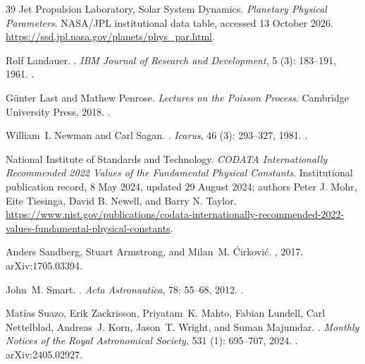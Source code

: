 \begin{thebibliography}{39}
Jet Propulsion Laboratory, Solar System Dynamics.
\newblock \emph{Planetary Physical Parameters}.
\newblock NASA/JPL institutional data table, accessed 13 October 2026.
\newblock \url{https://ssd.jpl.nasa.gov/planets/phys_par.html}.

Rolf Landauer.
.
\newblock \emph{IBM Journal of Research and Development}, 5
  (3): 183--191, 1961.
\newblock {}.

G{\"u}nter Last and Mathew Penrose.
\newblock \emph{{Lectures on the {Poisson} Process}}.
\newblock Cambridge University Press, 2018.
\newblock {}.

William~I. Newman and Carl Sagan.
.
\newblock \emph{Icarus}, 46 (3): 293--327, 1981.
\newblock {}.

National Institute of Standards and Technology.
\newblock \emph{CODATA Internationally Recommended 2022 Values of the
Fundamental Physical Constants}.
\newblock Institutional publication record, 8 May 2024, updated 29 August
2024; authors Peter J. Mohr, Eite Tiesinga, David B. Newell, and Barry N. Taylor.
\newblock \url{https://www.nist.gov/publications/codata-internationally-recommended-2022-values-fundamental-physical-constants}.

Anders Sandberg, Stuart Armstrong, and Milan~M. {\'C}irkovi{\'c}.
, 2017.
\newblock arXiv:1705.03394.

John~M. Smart.
.
\newblock \emph{Acta Astronautica}, 78: 55--68, 2012.
\newblock {}.

Mat\'ias Suazo, Erik Zackrisson, Priyatam~K. Mahto, Fabian Lundell, Carl
  Nettelblad, Andreas~J. Korn, Jason~T. Wright, and Suman Majumdar.
.
\newblock \emph{Monthly Notices of the Royal Astronomical Society},
  531 (1): 695--707, 2024.
\newblock {}.
\newblock arXiv:2405.02927.


\end{thebibliography}
